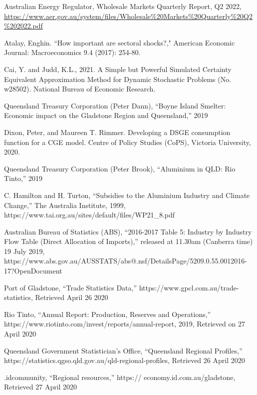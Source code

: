 \documentclass[12pt,a4paper]{article}
\begin{document}
\begin{thebibliography}{1}

   Australian Energy Regulator, Wholesale Markets Quarterly
    Report, Q2 2022, \url{https://www.aer.gov.au/system/files/Wholesale%20Markets%20Quarterly%20Q2%202022.pdf}

   Atalay, Enghin. ``How important are sectoral shocks?,"
    American Economic Journal: Macroeconomics 9.4 (2017): 254-80.

 Cai, Y. and Judd, K.L., 2021. A Simple but Powerful Simulated
  Certainty Equivalent Approximation Method for Dynamic Stochastic Problems
    (No. w28502). National Bureau of Economic Research.

 Queensland Treasury Corporation (Peter Dann), “Boyne Island
  Smelter: Economic impact on the Gladstone Region and Queensland,” 2019

 Dixon, Peter, and Maureen T. Rimmer.
  Developing a DSGE consumption function for a CGE model. Centre of Policy
    Studies (CoPS), Victoria University, 2020.

Queensland Treasury Corporation (Peter Brook), ``Aluminium in QLD: Rio Tinto,” 2019
  
C. Hamilton and H. Turton, ``Subsidies to the Aluminium
Industry and Climate Change,'' The Australia Institute, 1999, https://www.tai.org.au/sites/default/files/WP21\_8.pdf

 Australian Bureau of Statistics (ABS), ``2016-2017 Table 5: Industry by
  Industry Flow Table (Direct Allocation of Imports),” released at 11.30am
  (Canberra time) 19 July 2019, https://www.abs.gov.au/AUSSTATS/abs@.nsf/DetailsPage/5209.0.55.0012016-17?OpenDocument

 Port of Gladstone, ``Trade Statistics Data,''
 https://www.gpcl.com.au/trade-statistics, Retrieved  April 26 2020

  Rio Tinto, ``Annual Report: Production, Reserves and Operations,''
https://www.riotinto.com/invest/reports/annual-report, 2019, Retrieved on
27 April 2020

  Queensland Government Statistician’s Office,
  ``Queensland Regional Profiles,”
https://statistics.qgso.qld.gov.au/qld-regional-profiles, Retrieved 26 April 2020 
 
  .idcommunity, “Regional resources,” 
  https:// economy.id.com.au/gladstone, Retrieved 27 April 2020


\end{thebibliography}
\end{document}
